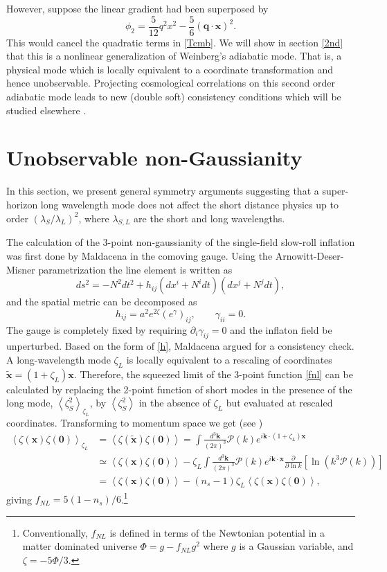 \documentclass[12pt]{article}
\numberwithin{equation}{section}
\def\bsb{\boldsymbol}
\def\be{\begin{equation}}
\def\ee{\end{equation}}
\def\d{\partial}
\def\x{{\bsb x}}
\def\q{{\bsb q}}
\newcommand{\mal}[1]{\mathcal #1}
\newcommand{\expect}[1]{\left\langle #1 \right\rangle}
\begin{document}
However, suppose the linear gradient had been superposed by
\be
\phi_2= \frac{5}{12} {q}^2 x^2-\frac{5}{6}(\q\cdot\x)^2 .
\ee
This would cancel the quadratic terms in \eqref{Tcmb}. We will show in section \ref{2nd} that this is a nonlinear generalization of Weinberg's adiabatic mode. That is, a physical mode which is locally equivalent to a coordinate transformation and hence unobservable. Projecting cosmological correlations on this second order adiabatic mode leads to new (double soft) consistency conditions which will be studied elsewhere \cite{double_soft,Joyce}.

\section{Unobservable non-Gaussianity\label{null}}

In this section, we present general symmetry arguments suggesting that a super-horizon long wavelength mode does not affect the short distance physics up to order $(\lambda_S/\lambda_L)^2$, where $\lambda_{S,L}$ are the short and long wavelengths. 

The calculation of the 3-point non-gaussianity of the single-field slow-roll inflation was first done by Maldacena \cite{Maldacena} in the comoving gauge. Using the Arnowitt-Deser-Misner parametrization the line element is written as
\be
ds^2 = -N^2 dt^2 + h_{ij}(dx^i+N^i dt)(dx^j+N^j dt),
\ee
and the spatial metric can be decomposed as
\be
\label{h}
h_{ij}=a^2 e^{2\zeta}\left(e^\gamma\right)_{ij},\qquad \gamma_{ii}=0.
\ee
The gauge is completely fixed by requiring $\d_i\gamma_{ij}=0$ and the inflaton field be unperturbed. Based on the form of \eqref{h}, Maldacena argued for a consistency check. A long-wavelength mode $\zeta_L$ is locally equivalent to a rescaling of coordinates $\tilde {\bsb x} = (1+\zeta_L)\bsb x$. Therefore, the squeezed limit of the 3-point function \eqref{fnl} can be calculated by replacing the 2-point function of short modes in the presence of the long mode, $\expect{\zeta_S^2}_{\zeta_L}$, by $\expect{\zeta_S^2}$ in the absence of $\zeta_L$ but evaluated at rescaled coordinates. Transforming to momentum space we get (see \cite{Creminelli_sct})
\be
\begin{split}
\expect{\zeta(\bsb x) \zeta(\bsb 0)}_{\zeta_L}&=\expect{\zeta(\tilde{\bsb x}) \zeta(\bsb 0)}=\int \frac{d^3\bsb k}{(2\pi)^3} \mal P(k) e^{i\bsb k\cdot (1+\zeta_L)\bsb x}\\[10pt]
&\simeq \expect{\zeta(\bsb x) \zeta(\bsb 0)}-\zeta_L \int \frac{d^3\bsb k}{(2\pi)^3} \mal P(k) e^{i\bsb k\cdot \bsb x} \frac{\d}{\d \ln k} \left[\ln (k^3 \mal P(k))\right] \nonumber\\[10pt]
&= \expect{\zeta(\bsb x) \zeta(\bsb 0)}-(n_s-1)\zeta_L\expect{\zeta(\bsb x) \zeta(\bsb 0)},\nonumber
\end{split}
\ee
giving $f_{NL} =5(1-n_s)/6$.\footnote{Conventionally, $f_{NL}$ is defined in terms of the Newtonian potential in a matter dominated universe $\Phi = g - f_{NL} g^2$ where $g$ is a Gaussian variable, and $\zeta = -5\Phi/3$.} 
\end{document}
